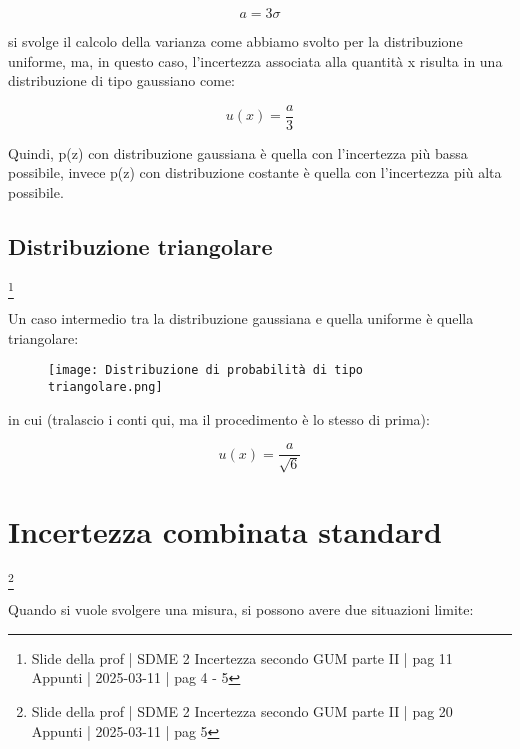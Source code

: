 {
    \Large 
    \begin{equation}
        a = 3\sigma
    \end{equation}
}

si svolge il calcolo della varianza come abbiamo svolto per la distribuzione uniforme, 
ma, in questo caso, l'incertezza associata alla quantità x risulta in una distribuzione di tipo gaussiano come: 

{
    \Large
    \begin{equation}
        u(x) = \frac{a}{3}
    \end{equation}
}

Quindi, p(z) con distribuzione gaussiana è quella con l'incertezza più bassa possibile, 
invece p(z) con distribuzione costante è quella con l'incertezza più alta possibile. \newline 

\newpage 

\subsection{Distribuzione triangolare}
\footnote{Slide della prof | SDME 2 Incertezza secondo GUM parte II | pag 11 \\  
Appunti | 2025-03-11 | pag 4 - 5}

Un caso intermedio tra la distribuzione gaussiana e quella uniforme è quella triangolare: 

\begin{figure}[h]
    \centering
    \texttt{[image: Distribuzione di probabilità di tipo triangolare.png]}
\end{figure}

in cui (tralascio i conti qui, ma il procedimento è lo stesso di prima):

{
    \Large 
    \begin{equation}
        u(x) = \frac{a}{\sqrt{6}}
    \end{equation}
}

\newpage 

\section{Incertezza combinata standard}
\footnote{Slide della prof | SDME 2 Incertezza secondo GUM parte II | pag 20 \\  
Appunti | 2025-03-11 | pag 5}

Quando si vuole svolgere una misura, 
si possono avere due situazioni limite: 

